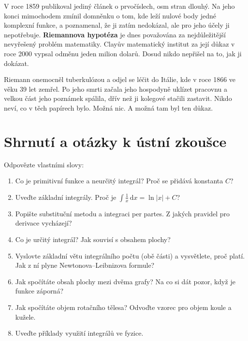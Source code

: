 V roce 1859 publikoval jediný článek o prvočíslech, osm stran dlouhý. Na jeho konci mimochodem zmínil domněnku o tom, kde leží nulové body jedné komplexní funkce, a poznamenal, že ji zatím nedokázal, ale pro jeho účely ji nepotřebuje. \textbf{Riemannova hypotéza} je dnes považována za nejdůležitější nevyřešený problém matematiky. Clayův matematický institut za její důkaz v roce 2000 vypsal odměnu jeden milion dolarů. Dosud nikdo nepřišel na to, jak ji dokázat.

Riemann onemocněl tuberkulózou a odjel se léčit do Itálie, kde v roce 1866 ve věku 39 let zemřel. Po jeho smrti začala jeho hospodyně uklízet pracovnu a velkou část jeho poznámek spálila, dřív než ji kolegové stačili zastavit. Nikdo neví, co v těch papírech bylo. Možná nic. A možná tam byl ten důkaz.

\section{Shrnutí a otázky k ústní zkoušce}

\begin{problem}
  Odpovězte vlastními slovy:
  \begin{enumerate}
    \item Co je primitivní funkce a neurčitý integrál? Proč se přidává konstanta $C$?
    \item Uveďte základní integrály. Proč je $\int\frac{1}{x}\,\mathrm{d}x = \ln|x| + C$?
    \item Popište substituční metodu a integraci per partes. Z jakých pravidel pro derivace vycházejí?
    \item Co je určitý integrál? Jak souvisí s obsahem plochy?
    \item Vyslovte základní větu integrálního počtu (obě části) a vysvětlete, proč platí. Jak z ní plyne Newtonova--Leibnizova formule?
    \item Jak spočítáte obsah plochy mezi dvěma grafy? Na co si dát pozor, když je funkce záporná?
    \item Jak spočítáte objem rotačního tělesa? Odvoďte vzorec pro objem koule a kužele.
    \item Uveďte příklady využití integrálů ve fyzice.
  \end{enumerate}
\end{problem}
